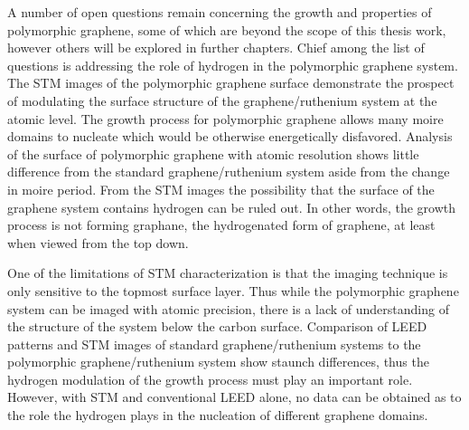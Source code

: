 A number of open questions remain concerning the growth and properties of polymorphic graphene, some of which are beyond the scope of this thesis work, however others will be explored in further chapters. Chief among the list of questions is addressing the role of hydrogen in the polymorphic graphene system. The STM images of the polymorphic graphene surface demonstrate the prospect of modulating the surface structure of the graphene/ruthenium system at the atomic level. The growth process for polymorphic graphene allows many moire domains to nucleate which would be otherwise energetically disfavored. Analysis of the surface of polymorphic graphene with atomic resolution shows little difference from the standard graphene/ruthenium system aside from the change in moire period. From the STM images the possibility that the surface of the graphene system contains hydrogen can be ruled out. In other words, the growth process is not forming graphane, the hydrogenated form of graphene, at least when viewed from the top down. 

One of the limitations of STM characterization is that the imaging technique is only sensitive to the topmost surface layer. Thus while the polymorphic graphene system can be imaged with atomic precision, there is a lack of understanding of the structure of the system below the carbon surface. Comparison of LEED patterns and STM images of standard graphene/ruthenium systems to the polymorphic graphene/ruthenium system show staunch differences, thus the hydrogen modulation of the growth process must play an important role. However, with STM and conventional LEED alone, no data can be obtained as to the role the hydrogen plays in the nucleation of different graphene domains.

